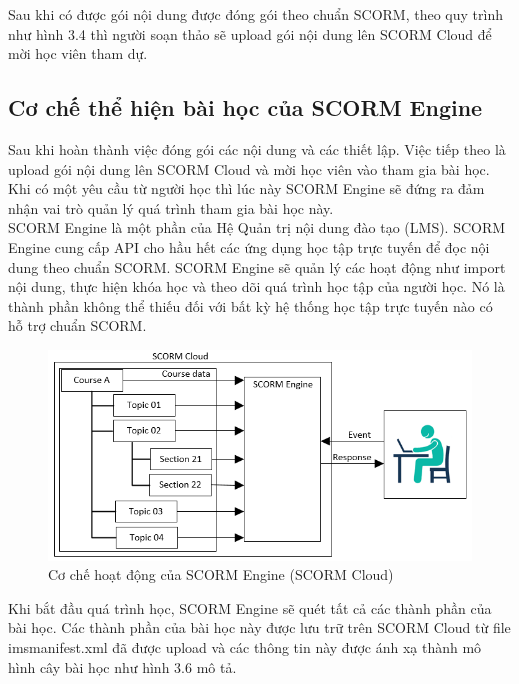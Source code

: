 	Sau khi có được gói nội dung được đóng gói theo chuẩn SCORM, theo quy trình như hình 3.4 thì người soạn thảo sẽ upload gói nội dung lên SCORM Cloud để mời học viên tham dự.



\subsection{Cơ chế thể hiện bài học của SCORM Engine}

	Sau khi hoàn thành việc đóng gói các nội dung và các thiết lập. Việc tiếp theo là upload gói nội dung lên SCORM Cloud và mời học viên vào tham gia bài học. Khi có một yêu cầu từ người học thì lúc này SCORM Engine sẽ đứng ra đảm nhận vai trò quản lý quá trình tham gia bài học này.\\

	SCORM Engine là một phần của Hệ Quản trị nội dung đào tạo (LMS). SCORM Engine cung cấp API cho hầu hết các ứng dụng học tập trực tuyến để đọc nội dung theo chuẩn SCORM. SCORM Engine sẽ quản lý các hoạt động như import nội dung, thực hiện khóa học và theo dõi quá trình học tập của người học. Nó là thành phần không thể thiếu đối với bất kỳ hệ thống học tập trực tuyến nào có hỗ trợ chuẩn SCORM.
	
	\begin{center}
	\begin{figure}[htp]
		\begin{center}
			\includegraphics[width=15cm]{Chapter3/Pictures/picture36.png}
		\end{center}
		\caption{Cơ chế hoạt động của SCORM Engine (SCORM Cloud)}
		\label{refpicture47}
	\end{figure}
\end{center}


	
	Khi bắt đầu quá trình học, SCORM Engine sẽ quét tất cả các thành phần của bài học. Các thành phần của bài học này được lưu trữ trên SCORM Cloud từ file imsmanifest.xml đã được upload và các thông tin này được ánh xạ thành mô hình cây bài học như hình 3.6 mô tả.\\
	

